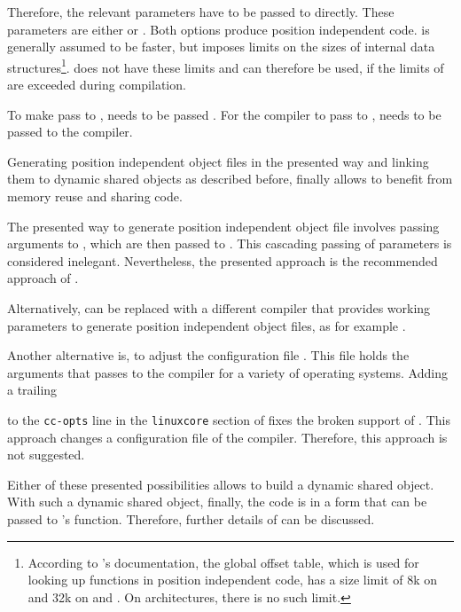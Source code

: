 Therefore, the relevant parameters have to be passed to \Gcc directly. These parameters are either  or . Both options produce position independent code.  is generally assumed to be faster, but imposes limits on the sizes of internal data structures\footnote{According to \Gcc's documentation, the global offset table, which is used for looking up functions in position independent code, has a size limit of 8k on \Sparc and 32k on \msixtyeightk and \RSsixk. On \xeightysix architectures, there is no such limit.}.  does not have these limits and can therefore be used, if the limits of  are exceeded during compilation. 

To make \Unicl pass  to \Gcc, \Unicl needs to be passed . For the \Aldor compiler to pass  to \Unicl,  needs to be passed to the \Aldor compiler.

Generating position independent object files in the presented way and linking them to dynamic shared objects as described before, finally allows to benefit from memory reuse and sharing code.

The presented way to generate position independent object file involves passing arguments to \Unicl, which are then passed to \Gcc. This cascading passing of parameters is considered inelegant. Nevertheless, the presented approach is the recommended approach of \LibCharSet.

Alternatively, \Unicl can be replaced with a different compiler that provides working parameters to generate position independent object files, as for example \Gcc.

Another alternative is, to adjust the \Aldor configuration file . This file holds the arguments that \Unicl passes to the \C compiler for a variety of operating systems. Adding a trailing
to the \verb|cc-opts| line in the \verb|linuxcore| section of  fixes the broken  support of \Unicl. This approach changes a configuration file of the \Aldor compiler. Therefore, this approach is not suggested.

Either of these presented possibilities allows to build a dynamic shared object. With such a dynamic shared object, finally, the code is in a form that can be passed to \Maple's  function. Therefore, further details of  can be discussed.

